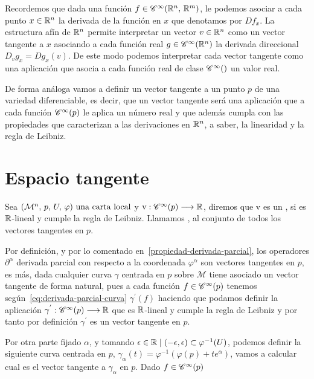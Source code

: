 \begin{summary}

Recordemos que dada una función $f\in\mathscr{C}^\infty(\mathbb{R}^n,\thinspace\mathbb{R}^m)$, le podemos asociar a cada punto $x\in\mathbb{R}^n$ la
derivada de la función en $x$ que denotamos por $Df_x$.
La estructura afín de $\mathbb{R}^n$ permite interpretar un vector $v\in\mathbb{R}^n$ como un vector tangente a $x$ asociando a cada
función real $g\in\mathscr{C}^\infty(\mathbb{R}^n)$ la derivada direccional $D_{v}g_x=Dg_x(v)$.
De este modo podemos interpretar cada vector tangente como una aplicación que asocia a cada función real de clase
$\cinfinity$ un valor real.

De forma análoga vamos a definir un vector tangente a un punto $p$ de una variedad diferenciable, es decir, que un
vector tangente será una aplicación que a cada función $\mathscr{C}^\infty(p)$ le aplica un número real y que además cumpla
con las propiedades que caracterizan a las derivaciones en $\mathbb{R}^n$, a saber, la linearidad y la regla de Leibniz.
\end{summary}

\section{Espacio tangente}\label{sec:espacio-tangente}

\begin{definition}
  Sea $(\mathcal{M}^n,\thinspace p,\thinspace U,\thinspace \varphi)\textmd{ una carta local}$ y $\mathrm{v}:\mathscr{C}^\infty(p)\longrightarrow \mathbb{R}$, diremos que $\mathrm{v}$ es un , si es $\mathbb{R}$-lineal y cumple la regla de Leibniz.
  Llamamos 
  , al conjunto de todos los vectores tangentes en $p$.
\end{definition}

Por definición, y por lo comentado en~\ref{propiedad-derivada-parcial}, los operadores $\partial^\alpha$ derivada
parcial con respecto a la coordenada $\varphi^\alpha$ son vectores tangentes en $p$, es más, dada cualquier curva
$\gamma$ centrada en $p$ sobre $\mathcal{M}$ tiene asociado un vector tangente de forma natural, pues a cada función
$f\in\mathscr{C}^\infty(p)$ tenemos según~\ref{eq:derivada-parcial-curva} $\gamma^{'}(f)$ haciendo que podamos definir la
aplicación $\gamma^{'}:\mathscr{C}^\infty(p)\longrightarrow \mathbb{R}$ que es $\mathbb{R}$-lineal y cumple la regla de Leibniz y por tanto por
definición $\gamma^{'}$ es un vector tangente en $p$.

Por otra parte fijado $\alpha$, y tomando $\epsilon\in\mathbb{R}\mid (-\epsilon, \epsilon)\subset\varphi^{-1}(U)$, podemos
definir la siguiente curva centrada en $p$, $\gamma_\alpha(t)=\varphi^{-1}(\varphi(p)+te^\alpha)$, vamos a calcular cual
es el vector tangente a $\gamma_\alpha$ en $p$.
Dado $f\in\mathscr{C}^\infty(p)$


